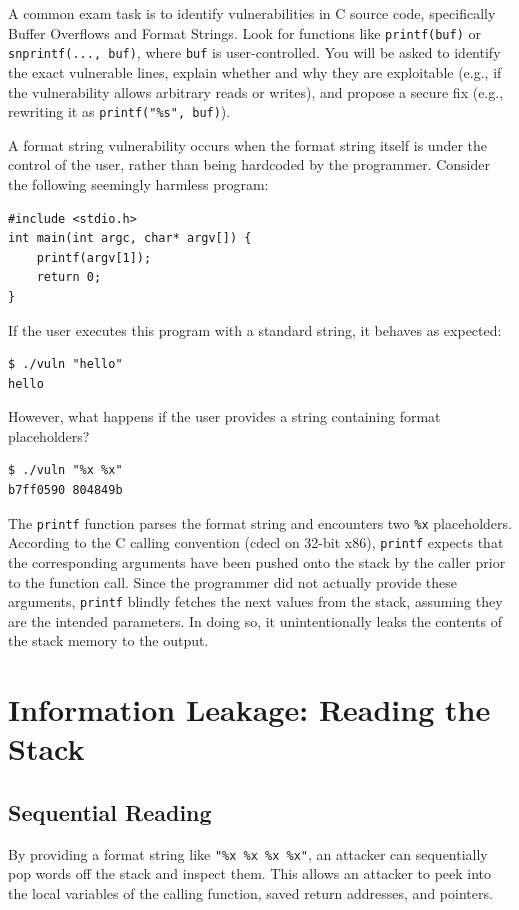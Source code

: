 \begin{tcolorbox}[colback=blue!5!white,colframe=blue!75!black,title=Exam Insight]
A common exam task is to identify vulnerabilities in C source code, specifically Buffer Overflows and Format Strings. Look for functions like \texttt{printf(buf)} or \texttt{snprintf(..., buf)}, where \texttt{buf} is user-controlled. You will be asked to identify the exact vulnerable lines, explain whether and why they are exploitable (e.g., if the vulnerability allows arbitrary reads or writes), and propose a secure fix (e.g., rewriting it as \texttt{printf("\%s", buf)}).
\end{tcolorbox}

A format string vulnerability occurs when the format string itself is under the control of the user, rather than being hardcoded by the programmer. Consider the following seemingly harmless program:

\begin{verbatim}
#include <stdio.h>
int main(int argc, char* argv[]) {
    printf(argv[1]);
    return 0;
}
\end{verbatim}

If the user executes this program with a standard string, it behaves as expected:
\begin{verbatim}
$ ./vuln "hello"
hello
\end{verbatim}

However, what happens if the user provides a string containing format placeholders?
\begin{verbatim}
$ ./vuln "%x %x"
b7ff0590 804849b
\end{verbatim}

The \texttt{printf} function parses the format string and encounters two \texttt{\%x} placeholders. According to the C calling convention (cdecl on 32-bit x86), \texttt{printf} expects that the corresponding arguments have been pushed onto the stack by the caller prior to the function call. Since the programmer did not actually provide these arguments, \texttt{printf} blindly fetches the next values from the stack, assuming they are the intended parameters. In doing so, it unintentionally leaks the contents of the stack memory to the output.

\section{Information Leakage: Reading the Stack}

\subsection{Sequential Reading}
By providing a format string like \texttt{"\%x \%x \%x \%x"}, an attacker can sequentially pop words off the stack and inspect them. This allows an attacker to peek into the local variables of the calling function, saved return addresses, and pointers.

